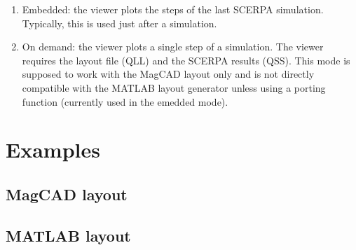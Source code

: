 \documentclass[a4paper,10pt]{article}
\begin{document}
\begin{enumerate}
\item Embedded: the viewer plots the steps of the last SCERPA simulation. Typically, this is used just after a simulation. 
\item On demand: the viewer plots a single step of a simulation. The viewer requires the layout file (QLL) and the SCERPA results (QSS). This mode is supposed to work with the MagCAD layout only and is not directly compatible with the MATLAB layout generator unless using a porting function (currently used in the emedded mode).
\end{enumerate}

\section{Examples}
\subsection{MagCAD layout}


\subsection{MATLAB layout}

\end{document}

